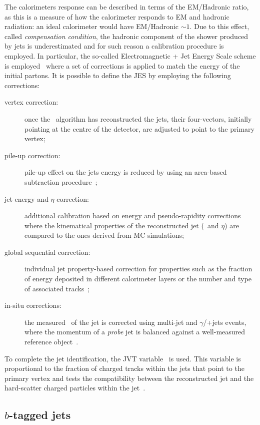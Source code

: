 			The calorimeters response can be described in terms of the \ac{EM}/Hadronic ratio, as this is a measure of how the calorimeter responds to \ac{EM} and hadronic radiation: an ideal calorimeter would have \ac{EM}/Hadronic $\sim1$. Due to this effect, called \emph{compensation condition}, the hadronic component of the shower produced by jets is underestimated and for such reason a calibration procedure is employed. In particular, the so-called Electromagnetic + Jet Energy Scale scheme is employed~\cite{ATL-PHYS-PUB-2015-015} where a set of corrections is applied to match the energy of the initial partons. It is possible to define the \ac{JES} by employing the following corrections:

			\begin{description}
				\item[vertex correction:] once the \antikt\ algorithm has reconstructed the jets, their four-vectors, initially pointing at the centre of the detector, are adjusted to point to the primary vertex; 
				\item[pile-up correction:] pile-up effect on the jets energy is reduced by using an area-based subtraction procedure~\cite{TheATLAScollaboration:2013pia}; 
				\item[jet energy and $\eta$ correction:] additional calibration based on energy and pseudo-rapidity corrections where the kinematical properties of the reconstructed jet (\pt\ and $\eta$) are compared to the ones derived from \ac{MC} simulations; 
				\item[global sequential correction:] individual jet property-based correction for properties such as the fraction of energy deposited in different calorimeter layers or the number and type of associated tracks~\cite{ATLAS:2015oia}; 
				\item[in-situ corrections:] the measured \pt\ of the jet is corrected using multi-jet and $\gamma$/\Zboson+jets events, where the momentum of a \emph{probe} jet is balanced against a well-measured reference object~\cite{ATLAS-CONF-2015-017}.
			\end{description}

			To complete the jet identification, the \ac{JVT} variable~\cite{ATLAS-CONF-2014-018} is used. This variable is proportional to the fraction of charged tracks within the jets that point to the primary vertex and tests the compatibility between the reconstructed jet and the hard-scatter charged particles within the jet~\cite{Aaboud:2017pou}.


		\subsection*{$b$-tagged jets}

